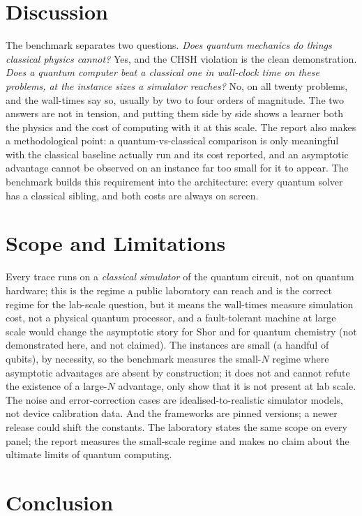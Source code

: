 \documentclass[journal]{IEEEtran}
\begin{document}
\section{Discussion}\label{sec:discuss}

The benchmark separates two questions. \emph{Does quantum mechanics do things classical physics cannot?} Yes,
and the CHSH violation is the clean demonstration. \emph{Does a quantum computer beat a classical one in
wall-clock time on these problems, at the instance sizes a simulator reaches?} No, on all twenty problems, and
the wall-times say so, usually by two to four orders of magnitude. The two answers are not in tension, and
putting them side by side shows a learner both the physics and the cost of computing with it at this scale. The
report also makes a methodological point: a quantum-vs-classical comparison is only meaningful with the
classical baseline actually run and its cost reported, and an asymptotic advantage cannot be observed on an
instance far too small for it to appear. The benchmark builds this requirement into the architecture: every
quantum solver has a classical sibling, and both costs are always on screen.

\section{Scope and Limitations}\label{sec:limits}

Every trace runs on a \emph{classical simulator} of the quantum circuit, not on quantum
hardware; this is the regime a public laboratory can reach and is the correct regime for the lab-scale question,
but it means the wall-times measure simulation cost, not a physical quantum processor, and a fault-tolerant
machine at large scale would change the asymptotic story for Shor and for quantum chemistry (not demonstrated
here, and not claimed). The instances are small (a handful of qubits), by necessity, so the benchmark measures
the small-$N$ regime where asymptotic advantages are absent by construction; it does not and cannot refute the
existence of a large-$N$ advantage, only show that it is not present at lab scale. The noise and
error-correction cases are idealised-to-realistic simulator models, not device calibration data. And the
frameworks are pinned versions; a newer release could shift the constants. The laboratory states the same scope
on every panel; the report measures the small-scale regime and makes no claim about the ultimate limits of
quantum computing.

\section{Conclusion}
\end{document}
